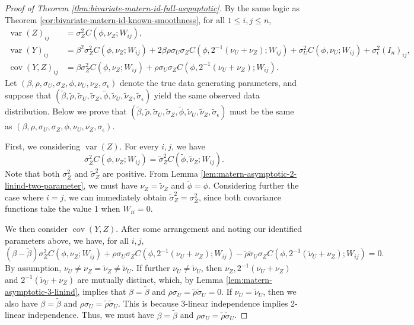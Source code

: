 \documentclass[11pt]{article}
\theoremstyle{definition}
\theoremstyle{remark}
\DeclareMathOperator{\var}{var}
\DeclareMathOperator{\cov}{cov}
\begin{document}
\begin{proof}[Proof of Theorem \ref{thm:bivariate-matern-id-full-asymptotic}]
By the same logic as Theorem \ref{cor:bivariate-matern-id-known-smoothness}, for all $1\le i, j\le n$, 
\begin{align*}\var(Z)_{ij} &= \sigma_Z^2 C(\phi, \nu_Z; W_{ij}),\\
\var(Y)_{ij} &= \beta^2 \sigma_Z^2 C(\phi, \nu_Z; W_{ij}) + 2\beta\rho \sigma_U\sigma_ZC(\phi, 2^{-1}(\nu_U+\nu_Z); W_{ij}) +  \sigma_U^2 C(\phi, \nu_U; W_{ij}) + \sigma_\epsilon^2(I_n)_{ij} , \\
\cov (Y,Z)_{ij} &= \beta \sigma_Z^2 C(\phi, \nu_Z; W_{ij}) + \rho\sigma_U\sigma_Z C(\phi, 2^{-1}(\nu_U+\nu_Z); W_{ij}).\end{align*} 
Let $(\beta, \rho, \sigma_U, \sigma_Z, \phi, \nu_U, \nu_Z, \sigma_\epsilon)$ denote the true data generating parameters, and suppose that $(\tilde\beta, \tilde\rho, \tilde\sigma_U, \tilde\sigma_Z, \tilde\phi, \tilde\nu_U, \tilde\nu_Z, \tilde\sigma_\epsilon)$  yield the same observed data distribution. 
Below we prove that $(\tilde\beta, \tilde\rho, \tilde\sigma_U, \tilde\sigma_Z, \tilde\phi, \tilde\nu_U, \tilde\nu_Z, \tilde\sigma_\epsilon)$ must be the same as $(\beta, \rho, \sigma_U, \sigma_Z, \phi, \nu_U, \nu_Z, \sigma_\epsilon)$. 

First, we considering $\var(Z)$. For every $i,j$, we have 
\[\sigma_Z^2 C(\phi, \nu_Z; W_{ij}) = \tilde\sigma_Z^2 C(\tilde\phi, \tilde\nu_Z; W_{ij}). \]
Note that both $\sigma_Z^2$ and $\tilde\sigma_Z^2$ are positive. 
From Lemma \ref{lem:matern-asymptotic-2-linind-two-parameter}, we must have $\nu_Z=\tilde\nu_Z$ and $\tilde\phi=\phi$.
Considering further the case where $i=j$, we can immediately obtain $\tilde\sigma_Z^2 = \sigma_Z^2$, since both covariance functions take the value 1 when $W_{ii}=0$.


We then consider $\cov (Y,Z)$. After some arrangement and noting our identified parameters above, we have, for all $i,j,$
\begin{equation}\label{eq:pars-covyz} (\beta-\tilde{\beta}) \sigma_Z^2 
C(\phi, \nu_Z; W_{ij}) + \rho\sigma_U\sigma_Z 
C(\phi, 2^{-1}(\nu_U+\nu_Z); W_{ij}) -\tilde\rho\tilde\sigma_U\sigma_Z  C(\phi, 2^{-1}(\tilde\nu_U+\nu_Z); W_{ij}) = 0.\end{equation} By assumption, $\nu_U\neq \nu_Z=\tilde\nu_Z \neq \tilde\nu_U$. If further $\nu_U \neq\tilde \nu_U$, then $\nu_Z, 2^{-1}(\nu_U+\nu_Z)$ and $2^{-1}(\tilde\nu_U+\nu_Z)$ are mutually distinct, which, by Lemma \ref{lem:matern-asymptotic-3-linind}, implies that $\beta = \tilde\beta$ and $\rho \sigma_U = \tilde\rho \tilde\sigma_U =0$.  
If $\nu_U = \tilde\nu_U$, then we also have $\beta = \tilde\beta$ and $\rho\sigma_U = \tilde\rho \tilde\sigma_U$. 
This is because 3-linear independence implies 2-linear independence. 
Thus, we must have $\beta = \tilde\beta$ and $\rho\sigma_U = \tilde\rho \tilde\sigma_U$. 



\end{proof}
\end{document}
